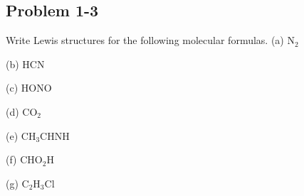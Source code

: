 \documentclass{article}[11pt]
\begin{document}
\subsection{Problem 1-3}
\label{sec:ch1p3}
\noindent
Write Lewis structures for the following molecular formulas.
\newline
\newline
(a) N$_{2}$
\newline
\newline
\begin{center}  \end{center}
\newline
\newline
(b) HCN
\newline
\newline
\begin{center}  \end{center}
\newline
\newline
(c) HONO
\newline
\newline
\begin{center}  \end{center}
\newline
\newline
(d) CO$_{2}$
\newline
\newline
\begin{center}  \end{center}
\newline
\newline
(e) CH$_{3}$CHNH
\newline
\newline
\begin{center}  \end{center}
\newline
\newline
(f) CHO$_{2}$H
\newline
\newline
\begin{center}  \end{center}
\newline
\newline
(g) C$_{2}$H$_{3}$Cl
\newline
\end{document}
